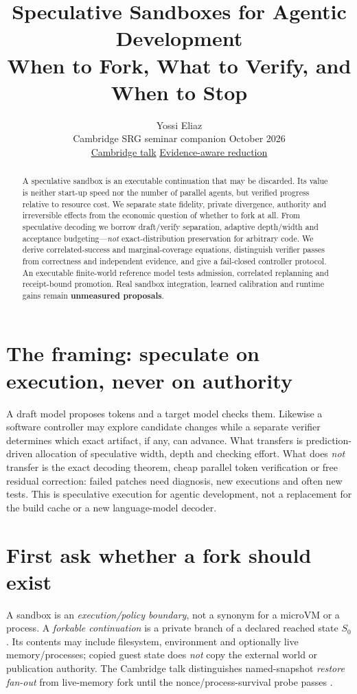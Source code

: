 \documentclass[10pt,twocolumn]{article}
\title{\vspace{-1.5em}\textcolor{ink}{\bfseries Speculative Sandboxes for Agentic Development}\\[-1pt]
\large When to Fork, What to Verify, and When to Stop}
\author{Yossi Eliaz\\[-1pt]\small Cambridge SRG seminar companion \quad\textbar\quad 13 October 2026\\[-2pt]
\small \href{https://github.com/zozo123/cam-talk-london-26}{Cambridge talk}\quad\textbar\quad
\href{https://arxiv.org/abs/2607.09689}{Evidence-aware reduction}}
\date{}
\newcommand{\1}{\mathbf{1}}
\begin{document}
\maketitle
\vspace{-1.3em}
\begin{abstract}\noindent
A speculative sandbox is an executable continuation that may be discarded. Its value is neither start-up speed nor the number of parallel agents, but verified progress relative to resource cost. We separate state fidelity, private divergence, authority and irreversible effects from the economic question of whether to fork at all. From speculative decoding we borrow draft/verify separation, adaptive depth/width and acceptance budgeting---\emph{not} exact-distribution preservation for arbitrary code. We derive correlated-success and marginal-coverage equations, distinguish verifier passes from correctness and independent evidence, and give a fail-closed controller protocol. An executable finite-world reference model tests admission, correlated replanning and receipt-bound promotion. Real sandbox integration, learned calibration and runtime gains remain \textbf{unmeasured proposals}.
\end{abstract}
\vspace{-0.5em}
\section{The framing: speculate on execution, never on authority}
A draft model proposes tokens and a target model checks them. Likewise a software controller may explore candidate changes while a separate verifier determines which exact artifact, if any, can advance. What transfers is prediction-driven allocation of speculative width, depth and checking effort. What does \emph{not} transfer is the exact decoding theorem, cheap parallel token verification or free residual correction: failed patches need diagnosis, new executions and often new tests. This is speculative execution for agentic development, not a replacement for the build cache or a new language-model decoder.

\section{First ask whether a fork should exist}

A sandbox is an \emph{execution/policy boundary}, not a synonym for a microVM or a process. A \emph{forkable continuation} is a private branch of a declared reached state $S_0$. Its contents may include filesystem, environment and optionally live memory/processes; copied guest state does \emph{not} copy the external world or publication authority. The Cambridge talk distinguishes named-snapshot \emph{restore fan-out} from live-memory fork until the nonce/process-survival probe passes \cite{cam}.
\end{document}
